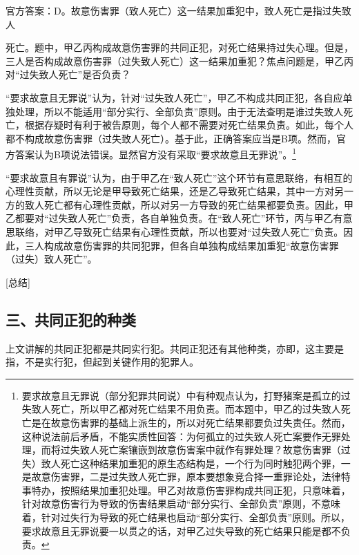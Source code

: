 官方答案：D。故意伤害罪（致人死亡）这一结果加重犯中，致人死亡是指过失致人

死亡。题中，甲乙丙构成故意伤害罪的共同正犯，对死亡结果持过失心理。但是，三人是否构成故意伤害罪（过失致人死亡）这一结果加重犯？焦点问题是，甲乙丙对“过失致人死亡”是否负责？

“要求故意且无罪说”认为，针对“过失致人死亡”，甲乙不构成共同正犯，各自应单独处理，所以不能适用“部分实行、全部负责”原则。由于无法查明是谁过失致人死亡，根据存疑时有利于被告原则，每个人都不需要对死亡结果负责。如此，每个人都不构成故意伤害罪（过失致人死亡）。基于此，正确答案应当是B项。然而，官方答案认为B项说法错误。显然官方没有采取“要求故意且无罪说”。\footnote{要求故意且无罪说（部分犯罪共同说）中有种观点认为，打野猪案是孤立的过失致人死亡，所以甲乙都对死亡结果不用负责。而本题中，甲乙的过失致人死亡是在故意伤害罪的基础上派生的，所以对死亡结果都要负过失责任。然而，这种说法前后矛盾，不能实质性回答：为何孤立的过失致人死亡案要作无罪处理，而将过失致人死亡案镶嵌到故意伤害案中就作有罪处理？故意伤害罪（过失）致人死亡这种结果加重犯的原生态结构是，一个行为同时触犯两个罪，一是故意伤害罪，二是过失致人死亡罪，原本要想象竞合择一重罪论处，法律特事特办，按照结果加重犯处理。甲乙对故意伤害罪构成共同正犯，只意味着，针对故意伤害行为导致的伤害结果启动“部分实行、全部负责”原则，不意味着，针对过失行为导致的死亡结果也启动“部分实行、全部负责”原则。所以，要求故意且无罪说要一以贯之的话，对甲乙过失导致的死亡结果只能是都不负责。}

“要求故意且有罪说”认为，由于甲乙在“致人死亡”这个环节有意思联络，有相互的心理性贡献，所以无论是甲导致死亡结果，还是乙导致死亡结果，其中一方对另一方的致人死亡都有心理性贡献，所以对另一方导致的死亡结果都要负责。因此，甲乙都要对“过失致人死亡”负责，各自单独负责。在“致人死亡”环节，丙与甲乙有意思联络，对甲乙导致死亡结果有心理性贡献，所以也要对“过失致人死亡”负责。因此，三人构成故意伤害罪的共同犯罪，但各自单独构成结果加重犯“故意伤害罪（过失）致人死亡”。

[总结]


\subsection*{三、共同正犯的种类}

上文讲解的共同正犯都是共同实行犯。共同正犯还有其他种类，亦即，这主要是指，不是实行犯，但起到关键作用的犯罪人。

